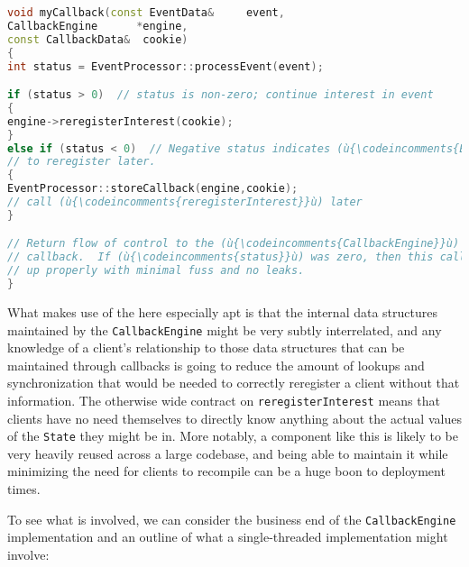 \begin{lstlisting}[language=C++]
void myCallback(const EventData&     event,
CallbackEngine      *engine,
const CallbackData&  cookie)
{
int status = EventProcessor::processEvent(event);

if (status > 0)  // status is non-zero; continue interest in event
{
engine->reregisterInterest(cookie);
}
else if (status < 0)  // Negative status indicates (ù{\codeincomments{EventProcessor}}ù) wants
// to reregister later.
{
EventProcessor::storeCallback(engine,cookie);
// call (ù{\codeincomments{reregisterInterest}}ù) later
}

// Return flow of control to the (ù{\codeincomments{CallbackEngine}}ù) that invoked this
// callback.  If (ù{\codeincomments{status}}ù) was zero, then this callback should be cleaned
// up properly with minimal fuss and no leaks.
}
\end{lstlisting}

\noindent What makes use of the  here especially apt is
that the internal data structures maintained by the
\lstinline!CallbackEngine! might be very subtly interrelated, and any
knowledge of a client's relationship to those data structures that can
be maintained through callbacks is going to reduce the amount of lookups
and synchronization that would be needed to correctly reregister a
client without that information. The otherwise wide contract on
\lstinline!reregisterInterest! means that clients have no need themselves
to directly know anything about the actual values of the \lstinline!State!
they might be in. More notably, a component like this is likely to be
very heavily reused across a large codebase, and being able to maintain
it while minimizing the need for clients to recompile can be a huge boon
to deployment times.

To see what is involved, we can consider the business end of the
\lstinline!CallbackEngine! implementation and an outline of what a
single-threaded implementation might involve:

